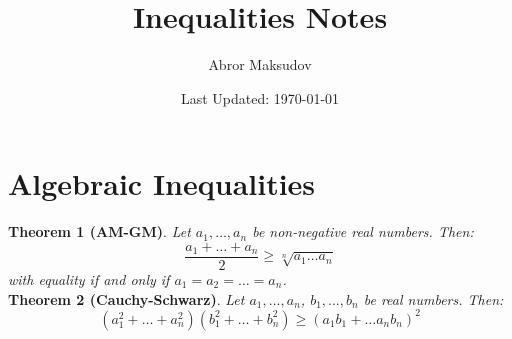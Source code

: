 \documentclass[a4paper,11pt]{article}
\title{Inequalities Notes}
\author{Abror Maksudov}
\date{Last Updated: \today}
\begin{document}
\maketitle

\section{Algebraic Inequalities}
\textbf{Theorem 1 (AM-GM)}. \textit{Let $a_1, \dots, a_n$ be non-negative real numbers. Then:}
\[
\frac{a_1 + \dots + a_n}{2} \geq \sqrt[n]{a_1 \dots a_n}
\]
\textit{with equality if and only if $a_1 = a_2 = \dots = a_n$.} \\[10pt]
\textbf{Theorem 2 (Cauchy-Schwarz)}. \textit{Let $a_1, \dots, a_n$, $b_1, \dots, b_n$ be real numbers. Then:}
\[
(a_1^2 + \dots + a_n^2)(b_1^2 + \dots + b_n^2) \geq (a_1b_1 + \dots a_nb_n)^2
\]
\end{document}
